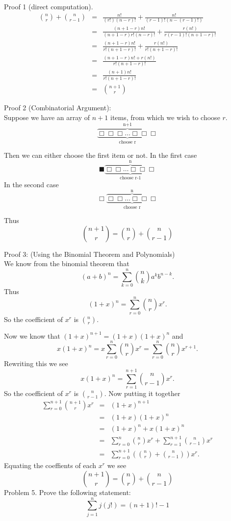 \documentclass[16 pt]{amsart}
\theoremstyle{definition}
\theoremstyle{remark}
\numberwithin{equation}{subsection}
\begin{document}
Proof 1 (direct computation).
\begin{eqnarray*}
{n \choose r} + {n \choose r-1}&=& \frac{n!}{(r!)(n-r)!} + \frac{n!}{(r-1)!(n-(r-1)!)}\\
&=& \frac{(n+1-r)n!}{(n+1-r)r!(n-r)!} + \frac{r (n!)}{r(r-1)!(n+1-r)!}\\
&=& \frac{(n+1-r)n!}{r!(n+1-r)!} + \frac{r(n!)}{r!(n+1-r)!}\\
&=& \frac{(n+1-r)n!+ r(n!)}{r!(n+1-r)!}\\
&=& \frac{(n+1)n!}{r!(n+1-r)!}\\
&=& {n+1 \choose r}
\end{eqnarray*}

\vspace{1in}
Proof 2 (Combinatorial Argument):\\
Suppose we have an array of $n+1$ items, from which we wish to choose $r$.
\[
\overbrace{\underbrace{\Box\Box\Box\dots\Box\Box\Box}_\text{choose r}}^\text{n+1}
\]

Then we can either choose the first item or not.  In the first case
\[
\blacksquare\overbrace{\underbrace{\Box\Box\dots\Box\Box\Box}_\text{choose r-1}}^\text{n}
\]
In the second case
\[
\Box\overbrace{\underbrace{\Box\Box\dots\Box\Box\Box}_\text{choose r}}^\text{n}
\]

Thus
\[
{n+1\choose r} = {n\choose r}+{n\choose r-1} 
\]
\newpage

Proof 3: (Using the Binomial Theorem and Polynomials)\\
We know from the binomial theorem that
\[
(a+b)^n = \sum_{k=0}^{n}{n\choose k}a^k b^{n-k}.
\]
Thus 
\[
(1+x)^n = \sum_{r=0}^{n}{n\choose r}x^r.
\]
So the coefficient of $x^r$ is ${n\choose r}$.

Now we know that $(1+x)^{n+1} = (1+x)(1+x)^n$ and
\[
x(1+x)^n = x\sum_{r=0}^{n}{n\choose r}x^r = \sum_{r=0}^{n}{n\choose r}x^{r+1}.
\]
Rewriting this we see
\[
x(1+x)^n = \sum_{r=1}^{n+1}{n\choose r-1}x^r.
\]
So the coefficient of $x^r$ is ${n \choose r-1}$.
Now putting it together
\begin{eqnarray*}
\sum_{r=0}^{n+1}{n+1\choose r}x^r&=& (1+x)^{n+1}\\
 &=& (1+x)(1+x)^n\\
&=&(1+x)^n + x(1+x)^n\\ 
&=& \sum_{r=0}^{n}{n\choose r}x^r + \sum_{r=1}^{n+1}{n\choose r-1}x^r\\
&=& \sum_{r=0}^{n+1}\left({n\choose r}+{n\choose r-1}\right)x^r.
\end{eqnarray*}
Equating the coeffients of each $x^r$ we see
\[
{n+1\choose r} = {n\choose r}+{n\choose r-1} 
\]
\newpage 
Problem 5.
Prove the following statement:
\[
\sum_{j=1}^{n} j(j!) = (n+1)!-1
\]
\end{document}
